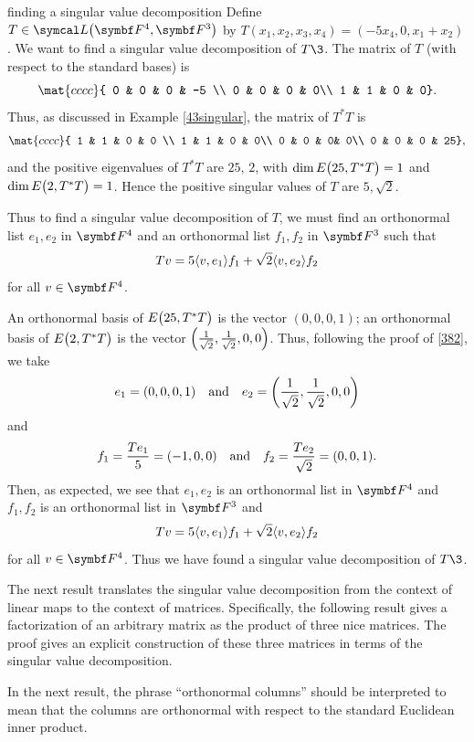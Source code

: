 \begin{example}{finding a singular value decomposition}
Define $T \in \L\paren[\big]{ \F4, \F3 }$ by $T(x_1, x_2, x_3, x_4) = (-5x_4, 0, x_1 + x_2)$. We want to find a singular value decomposition of $T\3$. The matrix of $T$ (with respect to the standard bases) is
\[
\mat{cccc}{
0 & 0 & 0 & -5 \\
0 & 0 & 0 & 0\\
1 & 1 & 0 & 0}.
\]
Thus, as discussed in Example \ref{43singular}, the matrix of $T^*T$ is
\[
\mat{cccc}{
1 & 1 & 0 & 0 \\
1 & 1 & 0 & 0\\
0 & 0 & 0& 0\\
0 & 0 & 0 & 25},
\]
and the positive eigenvalues of $T^*T$ are $25$, $2$, with
$\dim E\paren[\big]{25, T^* T} = 1$ and $\dim E\paren[\big]{2, T^* T} = 1$. Hence the positive singular values of $T$ are $5, \sqrt{2}$.

Thus to find a singular value decomposition of $T$, we must find an orthonormal list $e_1, e_2$ in
$\F4$ and an orthonormal list $f_1, f_2$ in $\F3$ such that
\[
Tv = 5 \ip{v, e_1} f_1 + \sqrt{2} \ip{v, e_2} f_2
\]
for all $v \in \F4$.

An orthonormal basis of $E\paren[\big]{25, T^* T}$ is the vector $(0,0,0,1 )$; an orthonormal basis of $E\paren[\big]{2, T^*T}$ is the vector $\paren[\Big]{ \frac{1}{\sqrt{2}}, \frac{1}{\sqrt{2}},0,0 }$. Thus, following the proof of \ref{382}, we take
\[
e_1 = (0,0,0,1) \andd e_2 = \paren[\bigg]{ \frac{1}{\sqrt{2}}, \frac{1}{\sqrt{2}},0,0 }
\]
and
\[
f_1 = \frac{Te_1}{5} = (-1, 0, 0) \andd f_2 = \frac{Te_2}{\sqrt{2}} = (0, 0, 1).
\]
Then, as expected, we see that $e_1, e_2$ is an orthonormal list in
$\F4$ and $f_1, f_2$ is an orthonormal list in $\F3$ and
\[
Tv = 5 \ip{v, e_1} f_1 + \sqrt{2} \ip{v, e_2} f_2
\]
for all $v \in \F4$. Thus we have found a singular value decomposition of $T\3$.
\end{example}

The next result translates the singular value decomposition from the context of linear maps to the context of matrices. Specifically, the following result gives a factorization of an arbitrary matrix as the product of three nice matrices. The proof gives an explicit construction of these three matrices in terms of the singular value decomposition.

In the next result, the phrase ``orthonormal columns'' should be interpreted to mean that the columns are orthonormal with respect to the standard Euclidean inner product.

